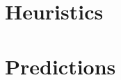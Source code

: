 \section{Heuristics}
\label{sec:Heuristics}

\section{Predictions}
\label{sec:Predictions}

\endinput

Any text after an \endinput is ignored.
You could put scraps here or things in progress.
